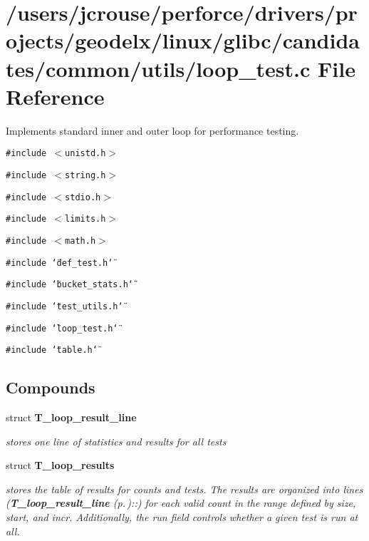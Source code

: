 \section{/users/jcrouse/perforce/drivers/projects/geodelx/linux/glibc/candidates/common/utils/loop\_\-test.c File Reference}
\label{loop__test_8c}
Implements standard inner and outer loop for performance testing. 


{\tt \#include $<$unistd.h$>$}\par
{\tt \#include $<$string.h$>$}\par
{\tt \#include $<$stdio.h$>$}\par
{\tt \#include $<$limits.h$>$}\par
{\tt \#include $<$math.h$>$}\par
{\tt \#include \char`\"{}def\_\-test.h\char`\"{}}\par
{\tt \#include \char`\"{}bucket\_\-stats.h\char`\"{}}\par
{\tt \#include \char`\"{}test\_\-utils.h\char`\"{}}\par
{\tt \#include \char`\"{}loop\_\-test.h\char`\"{}}\par
{\tt \#include \char`\"{}table.h\char`\"{}}\par
\subsection*{Compounds}
\begin{CompactItemize}
\item 
struct {\bf T\_\-loop\_\-result\_\-line}
\begin{CompactList}\small\item\em stores one line of statistics and results for all tests\item\end{CompactList}\item 
struct {\bf T\_\-loop\_\-results}
\begin{CompactList}\small\item\em stores the table of results for counts and tests. The results are organized into lines ({\bf T\_\-loop\_\-result\_\-line} {\rm (p.\,\pageref{structT__loop__result__line})}::) for each valid count in the range defined by size, start, and incr. Additionally, the run field controls whether a given test is run at all.\item\end{CompactList}\end{CompactItemize}
